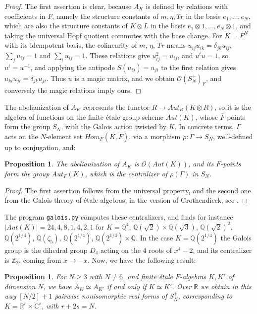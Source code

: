 \documentclass[11pt]{amsart}
\newtheorem{proposition}[theorem]{Proposition}
\theoremstyle{definition}
\begin{document}
\begin{proof}
The first assertion is clear, because $A_K$ is defined by relations with coefficients in $F$, namely the structure constants of $m,\eta,Tr$ in the basis $e_1,\ldots,e_N$, which are also the structure constants of $K\otimes L$ in the basis $e_1\otimes1,\ldots,e_N\otimes1$, and taking the universal Hopf quotient commutes with the base change. For $K=F^N$ with its idempotent basis, the colinearity of $m$, $\eta$, $Tr$ means $u_{ij}u_{ik}=\delta_{jk}u_{ij}$, $\sum_ju_{ij}=1$ and $\sum_iu_{ij}=1$. These relations give $u_{ij}^2=u_{ij}$, and $u^tu=1$, so $u^t=u^{-1}$, and applying the antipode $S(u_{ij})=u_{ji}$ to the first relation gives $u_{ki}u_{ji}=\delta_{jk}u_{ji}$. Thus $u$ is a magic matrix, and we obtain $\mathcal O(S_N^+)_F$, and conversely the magic relations imply ours.
\end{proof}

The abelianization of $A_K$ represents the functor $R\to Aut_R(K\otimes R)$, so it is the algebra of functions on the finite étale group scheme $Aut(K)$, whose $\bar F$-points form the group $S_N$, with the Galois action twisted by $K$. In concrete terms, $\Gamma$ acts on the $N$-element set $Hom_F(K,\bar F)$, via a morphism $\rho:\Gamma\to S_N$, well-defined up to conjugation, and:

\begin{proposition}
\label{p53}
The abelianization of $A_K$ is $\mathcal O(Aut(K))$, and its $F$-points form the group $Aut_F(K)$, which is the centralizer of $\rho(\Gamma)$ in $S_N$.
\end{proposition}

\begin{proof}
The first assertion follows from the universal property, and the second one from the Galois theory of étale algebras, in the version of Grothendieck, see \cite{wat}.
\end{proof}

The program {\tt galois.py} computes these centralizers, and finds for instance $|Aut(K)|=24,4,8,1,4,2,1$ for $K=\mathbb Q^4$, $\mathbb Q(\sqrt2)\times\mathbb Q(\sqrt3)$, $\mathbb Q(\sqrt2)^2$, $\mathbb Q(2^{1/3})$, $\mathbb Q(\zeta_5)$, $\mathbb Q(2^{1/4})$, $\mathbb Q(2^{1/3})\times\mathbb Q$. In the case $K=\mathbb Q(2^{1/4})$ the Galois group is the dihedral group $D_4$ acting on the 4 roots of $x^4-2$, and its centralizer is $\mathbb Z_2$, coming from $x\to-x$. Now, we have the following result:

\begin{proposition}
\label{p54}
For $N\geq3$ with $N\neq6$, and finite étale $F$-algebras $K,K'$ of dimension $N$, we have $A_K\simeq A_{K'}$ if and only if $K\simeq K'$. Over $\mathbb R$ we obtain in this way $[N/2]+1$ pairwise nonisomorphic real forms of $S_N^+$, corresponding to $K=\mathbb R^r\times\mathbb C^s$, with $r+2s=N$.
\end{proposition}
\end{document}
